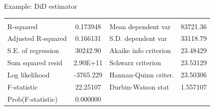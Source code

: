 \documentclass{beamer}
\begin{document}
\begin{frame}{Example: DiD estimator}
\begin{table}[]
\begin{tabular}{lclcc}
                                & \multicolumn{1}{l}{} &                                & \multicolumn{1}{l}{} & \multicolumn{1}{l}{}      \\
R-squared                       & 0.173948             & \multicolumn{2}{l}{Mean dependent var}                & 83721.36                  \\
Adjusted R-squared              & 0.166131             & \multicolumn{2}{l}{S.D. dependent var}                & 33118.79                  \\
S.E. of regression              & 30242.90             & \multicolumn{2}{l}{Akaike info criterion}             & 23.48429                  \\
Sum squared resid               & 2.90E+11             & \multicolumn{2}{l}{Schwarz criterion}                 & 23.53129                  \\
Log likelihood                  & -3765.229            & \multicolumn{2}{l}{Hannan-Quinn criter.}              & 23.50306                  \\
F-statistic                     & 22.25107             & \multicolumn{2}{l}{Durbin-Watson stat}                & 1.557107                  \\
Prob(F-statistic)               & 0.000000             & \multicolumn{2}{l}{}                                  & \multicolumn{1}{l}{}     
\end{tabular}
\end{table}
\end{frame}
\end{document}
